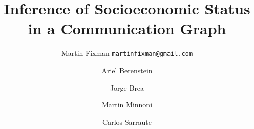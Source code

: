


\newcommand{\todo}[1]{\textbf{\color{red} TODO: #1}}




\title{Inference of Socioeconomic Status in a Communication Graph}


\author{%
	Martin Fixman
	 \texttt{martinfixman@gmail.com}
	\and 
	Ariel Berenstein
	\and 
	Jorge Brea
	\and 
	Martin Minnoni
	\and 
	Carlos Sarraute
}

\maketitle


\begin{abstract}
	
\end{abstract}















{}


